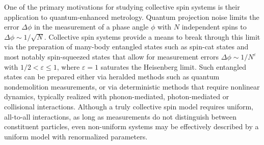 \documentclass[aps,pra,twocolumn,longbibliography]{revtex4-2}
\newcommand{\1}{\mathds{1}}
\begin{document}
One of the primary motivations for studying collective spin systems is
their application to quantum-enhanced metrology.  Quantum projection
noise limits the error $\Delta\phi$ in the measurement of a phase
angle $\phi$ with $N$ independent spins to
$\Delta\phi\sim1/\sqrt{N}$\cite{wineland1992spin, itano1993quantum}.
Collective spin systems provide a means to break through this limit
via the preparation of many-body entangled states such as spin-cat
states\cite{agarwal1997atomic, lau2014proposal, huang2015quantum} and
most notably spin-squeezed states\cite{wineland1992spin,
  kitagawa1993squeezed, ma2011quantum} that allow for measurement
errors $\Delta\phi\sim1/N^\varepsilon$ with $1/2<\varepsilon\le1$,
where $\varepsilon=1$ saturates the Heisenberg
limit\cite{zwierz2010general}.  Such entangled states can be prepared
either via heralded methods such as quantum nondemolition
measurements\cite{takano2009spin, appel2009mesoscopic,
  schleier-smith2010states, chen2011conditional}, or via deterministic
methods that require nonlinear dynamics, typically realized with
phonon-mediated\cite{bohnet2016quantum},
photon-mediated\cite{klinder2015dynamical, baumann2010dicke,
  leroux2010implementation, bohnet2014reduced, cox2016deterministic,
  hosten2016measurement, hosten2016quantum, norcia2018cavitymediated,
  ritsch2013cold} or collisional\cite{esteve2008squeezing,
  riedel2010atomchipbased, gross2010nonlinear, martin2013quantum,
  bromley2018dynamics, smale2019observation} interactions.  Although a
truly collective spin model requires uniform, all-to-all interactions,
as long as measurements do not distinguish between constituent
particles, even non-uniform systems may be effectively described by a
uniform model with renormalized parameters\cite{hu2015entangled}.
\end{document}
